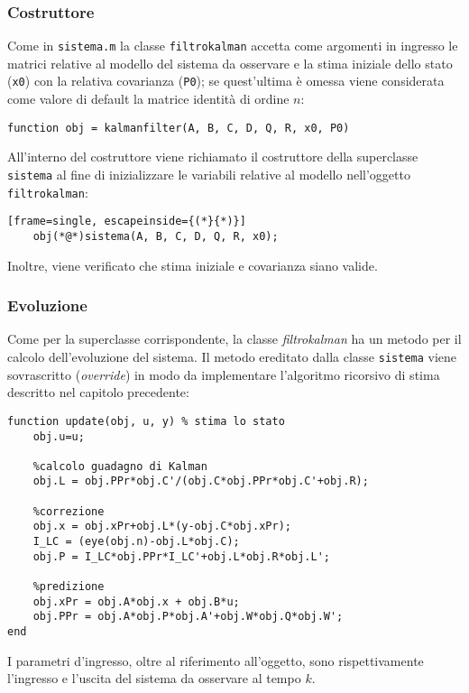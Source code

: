 \subsubsection{Costruttore}
Come in \texttt{sistema.m} la classe \texttt{filtrokalman} accetta come argomenti in ingresso le matrici relative al modello del sistema da osservare e la stima iniziale dello stato (\texttt{x0}) con la relativa covarianza (\texttt{P0}); se quest'ultima è omessa viene considerata come valore di default la matrice identità di ordine $n$:
\begin{lstlisting}[frame=single]
function obj = kalmanfilter(A, B, C, D, Q, R, x0, P0)
\end{lstlisting}
All'interno del costruttore viene richiamato il costruttore della superclasse \texttt{sistema} al fine di inizializzare le variabili relative al modello nell'oggetto \texttt{filtrokalman}:
\begin{lstlisting}[frame=single, escapeinside={(*}{*)}]
	obj(*@*)sistema(A, B, C, D, Q, R, x0);
\end{lstlisting}
Inoltre, viene verificato che stima iniziale e covarianza siano valide.
\newpage
\subsubsection{Evoluzione}
Come per la superclasse corrispondente, la classe \textit{filtrokalman} ha un metodo per il calcolo dell'evoluzione del sistema. Il metodo ereditato dalla classe \texttt{sistema} viene sovrascritto (\textit{override}) in modo da implementare l'algoritmo ricorsivo di stima descritto nel capitolo precedente:
\begin{lstlisting}[frame=single]
function update(obj, u, y) % stima lo stato
	obj.u=u;
	
	%calcolo guadagno di Kalman
	obj.L = obj.PPr*obj.C'/(obj.C*obj.PPr*obj.C'+obj.R);
	
	%correzione
	obj.x = obj.xPr+obj.L*(y-obj.C*obj.xPr);
	I_LC = (eye(obj.n)-obj.L*obj.C);
	obj.P = I_LC*obj.PPr*I_LC'+obj.L*obj.R*obj.L';
	
	%predizione
	obj.xPr = obj.A*obj.x + obj.B*u;
	obj.PPr = obj.A*obj.P*obj.A'+obj.W*obj.Q*obj.W';
end
\end{lstlisting}
I parametri d'ingresso, oltre al riferimento all'oggetto, sono rispettivamente l'ingresso e l'uscita del sistema da osservare al tempo $k$.

